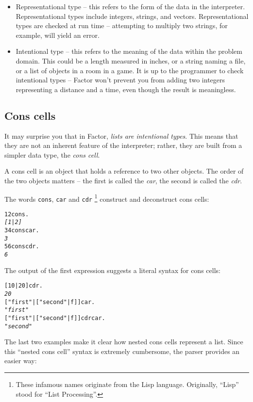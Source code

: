 \documentclass[english]{article}
\begin{document}
\begin{itemize}
\item Representational type -- this refers to the form of the data in the
interpreter. Representational types include integers, strings, and
vectors. Representational types are checked at run time -- attempting
to multiply two strings, for example, will yield an error.
\item Intentional type -- this refers to the meaning of the data within
the problem domain. This could be a length measured in inches, or
a string naming a file, or a list of objects in a room in a game.
It is up to the programmer to check intentional types -- Factor won't
prevent you from adding two integers representing a distance and a
time, even though the result is meaningless.
\end{itemize}

\subsection{Cons cells}

It may surprise you that in Factor, \emph{lists are intentional types}.
This means that they are not an inherent feature of the interpreter;
rather, they are built from a simpler data type, the \emph{cons cell}.

A cons cell is an object that holds a reference to two other objects.
The order of the two objects matters -- the first is called the \emph{car},
the second is called the \emph{cdr}.

The words \texttt{cons}, \texttt{car} and \texttt{cdr}%
\footnote{These infamous names originate from the Lisp language. Originally,
{}``Lisp'' stood for {}``List Processing''.%
} construct and deconstruct cons cells:

\begin{alltt}
1 2 cons .
\emph{{[} 1 | 2 {]}}
3 4 cons car .
\emph{3}
5 6 cons cdr .
\emph{6}
\end{alltt}
The output of the first expression suggests a literal syntax for cons
cells:

\begin{alltt}
{[} 10 | 20 {]} cdr .
\emph{20}
{[} "first" | {[} "second" | f {]} {]} car .
\emph{"first"}
{[} "first" | {[} "second" | f {]} {]} cdr car .
\emph{"second"}
\end{alltt}
The last two examples make it clear how nested cons cells represent
a list. Since this {}``nested cons cell'' syntax is extremely cumbersome,
the parser provides an easier way:
\end{document}
